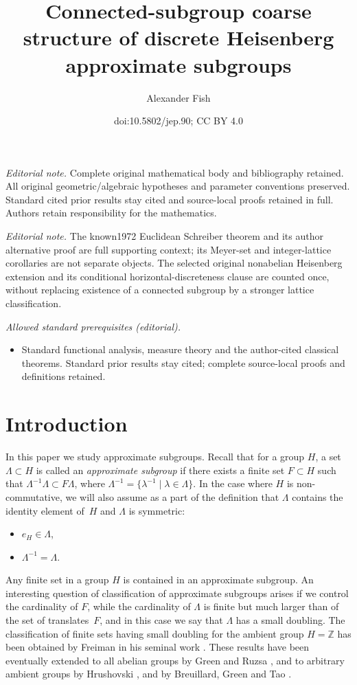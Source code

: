 \documentclass[10pt]{amsart}
\title{Connected-subgroup coarse structure of discrete Heisenberg approximate subgroups}
\author{Alexander Fish}
\date{doi:10.5802/jep.90; CC BY 4.0}
\newcommand{\bZ}{\mathbb{Z}}
\theoremstyle{plain}
\theoremstyle{definition}
\providecommand{\mainmatter}{}\providecommand{\backmatter}{}
\begin{document}
\maketitle
\noindent\textit{Editorial note.} Complete original mathematical body and bibliography retained. All original geometric/algebraic hypotheses and parameter conventions preserved. Standard cited prior results stay cited and source-local proofs retained in full. Authors retain responsibility for the mathematics.\par\medskip
\noindent\textit{Editorial note.} The known1972 Euclidean Schreiber theorem and its author alternative proof are full supporting context; its Meyer-set and integer-lattice corollaries are not separate objects. The selected original nonabelian Heisenberg extension and its conditional horizontal-discreteness clause are counted once, without replacing existence of a connected subgroup by a stronger lattice classification.\par\medskip
\noindent\textit{Allowed standard prerequisites (editorial).}\begin{itemize}
\item Standard functional analysis, measure theory and the author-cited classical theorems. Standard prior results stay cited; complete source-local proofs and definitions retained.
\end{itemize}\medskip
\vspace*{-\baselineskip}%
\tableofcontents
\mainmatter

\section{Introduction}

In this paper we study approximate subgroups. Recall that for a group $H$, a set $\Lambda \subset H$ is called an \textit{approximate subgroup} if there exists a finite set $F \subset H$ such that $\Lambda^{-1}\Lambda \subset F \Lambda $, where $\Lambda^{-1} = \{ \lambda^{-1} \mid \lambda \in \Lambda \}$. In the case where $H$ is non-commutative, we will also assume as a part of the definition that $\Lambda$ contains the identity element of~$H$ and $\Lambda$ is symmetric:\enlargethispage{.2\baselineskip}%
\begin{itemize}
\item $e_H \in \Lambda$,
\item $\Lambda^{-1} = \Lambda$.
\end{itemize}

Any finite set in a group $H$ is contained in an approximate subgroup. An interesting question of classification of approximate subgroups arises if we control the cardinality of $F$, while the cardinality of $\Lambda$ is finite but much larger than of the set of translates~$F$, and in this case we say that $\Lambda$ has a small doubling. The classification of finite sets having small doubling for the ambient group $H = \bZ$ has been obtained by Freiman in his seminal work \cite{Fr}. These results have been eventually extended to all abelian groups by Green and Ruzsa \cite{GR}, and to arbitrary ambient groups by Hrushovski \cite{Hr}, and by Breuillard, Green and Tao \cite{BGT}.
\end{document}
